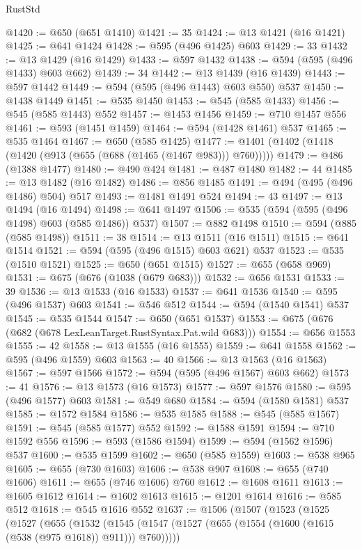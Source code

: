 \begin{lexlean}{RustStd}
\begin{coremodule}
@1420 := @650 (@651 @1410)
@1421 := 35
@1424 := @13 @1421 (@16 @1421)
@1425 := @641 @1424
@1428 := @595 (@496 @1425) @603
@1429 := 33
@1432 := @13 @1429 (@16 @1429)
@1433 := @597 @1432
@1438 := @594 (@595 (@496 @1433) @603 @662)
@1439 := 34
@1442 := @13 @1439 (@16 @1439)
@1443 := @597 @1442
@1449 := @594 (@595 (@496 @1443) @603 @550) @537
@1450 := @1438 @1449
@1451 := @535 @1450
@1453 := @545 (@585 @1433)
@1456 := @545 (@585 @1443) @552
@1457 := @1453 @1456
@1459 := @710 @1457 @556
@1461 := @593 (@1451 @1459)
@1464 := @594 (@1428 @1461) @537
@1465 := @535 @1464
@1467 := @650 (@585 @1425)
@1477 := @1401 (@1402 (@1418 (@1420 (@913 (@655 (@688 (@1465 (@1467 @983))) @760)))))
@1479 := @486 (@1388 @1477)
@1480 := @490 @424
@1481 := @487 @1480
@1482 := 44
@1485 := @13 @1482 (@16 @1482)
@1486 := @856 @1485
@1491 := @494 (@495 (@496 @1486) @504) @517
@1493 := @1481 @1491 @524
@1494 := 43
@1497 := @13 @1494 (@16 @1494)
@1498 := @641 @1497
@1506 := @535 (@594 (@595 (@496 @1498) @603 (@585 @1486)) @537)
@1507 := @882 @1498
@1510 := @594 (@885 (@585 @1498))
@1511 := 38
@1514 := @13 @1511 (@16 @1511)
@1515 := @641 @1514
@1521 := @594 (@595 (@496 @1515) @603 @621) @537
@1523 := @535 (@1510 @1521)
@1525 := @650 (@651 @1515)
@1527 := @655 (@658 @969)
@1531 := @675 (@676 (@1038 (@679 @683)))
@1532 := @656 @1531
@1533 := 39
@1536 := @13 @1533 (@16 @1533)
@1537 := @641 @1536
@1540 := @595 (@496 @1537) @603
@1541 := @546 @512
@1544 := @594 (@1540 @1541) @537
@1545 := @535 @1544
@1547 := @650 (@651 @1537)
@1553 := @675 (@676 (@682 (@678 LexLeanTarget.RustSyntax.Pat.wild @683)))
@1554 := @656 @1553
@1555 := 42
@1558 := @13 @1555 (@16 @1555)
@1559 := @641 @1558
@1562 := @595 (@496 @1559) @603
@1563 := 40
@1566 := @13 @1563 (@16 @1563)
@1567 := @597 @1566
@1572 := @594 (@595 (@496 @1567) @603 @662)
@1573 := 41
@1576 := @13 @1573 (@16 @1573)
@1577 := @597 @1576
@1580 := @595 (@496 @1577) @603
@1581 := @549 @680
@1584 := @594 (@1580 @1581) @537
@1585 := @1572 @1584
@1586 := @535 @1585
@1588 := @545 (@585 @1567)
@1591 := @545 (@585 @1577) @552
@1592 := @1588 @1591
@1594 := @710 @1592 @556
@1596 := @593 (@1586 @1594)
@1599 := @594 (@1562 @1596) @537
@1600 := @535 @1599
@1602 := @650 (@585 @1559)
@1603 := @538 @965
@1605 := @655 (@730 @1603)
@1606 := @538 @907
@1608 := @655 (@740 @1606)
@1611 := @655 (@746 @1606) @760
@1612 := @1608 @1611
@1613 := @1605 @1612
@1614 := @1602 @1613
@1615 := @1201 @1614
@1616 := @585 @512
@1618 := @545 @1616 @552
@1637 := @1506
    (@1507
      (@1523
        (@1525
          (@1527
            (@655
              (@1532
                (@1545
                  (@1547 (@1527 (@655 (@1554 (@1600 (@1615 (@538 (@975 @1618)) @911))) @760)))))

\end{coremodule}
\end{lexlean}
